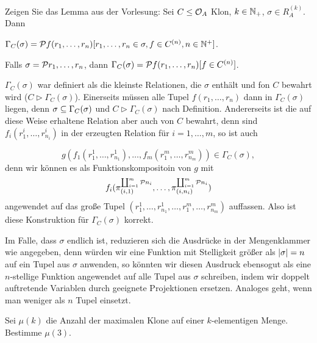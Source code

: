 \documentclass{book}
\begin{document}
\begin{exercise}
    Zeigen Sie das Lemma aus der Vorlesung:
    Sei $C\leq \mathcal{O}_A$ Klon, $k\in\mathbb{N}_+$, $\sigma\in R_A^{(k)}$. Dann
    \begin{statements}
            \item $\Gamma_C(\sigma)=\set{f(r_1,\ldots,r_n)}[r_1,\ldots,r_n\in\sigma,f\in C^{(n)},n\in\nats^+]$.
        \item Falls $\sigma=\set{r_1,\ldots,r_n}$, dann $\Gamma_C(\sigma)=\set{f(r_1,\ldots,r_n)}[f\in C^{(n)}]$.
    \end{statements}
\end{exercise}

\begin{solution}
    \begin{tasks}
        \item $\Gamma_C(\sigma)$ war definiert als die kleinste Relationen, die $\sigma$ enthält und fon $C$ bewahrt wird ($C\rhd \Gamma_C(\sigma)$). Einerseits müssen alle Tupel $f(r_1,\ldots,r_n)$ dann in $\Gamma_C(\sigma)$ liegen, denn $\sigma\subseteq\Gamma_C(\sigma)$ und $C\rhd \Gamma_C(\sigma)$ nach Definition.
    Andererseits ist die auf diese Weise erhaltene Relation aber auch von $C$ bewahrt, denn sind $f_i(r^i_1,\ldots,r^i_{n_i})$ in der erzeugten Relation für $i=1,\ldots,m$, so ist auch

    $$
    g(f_1(r^1_1,\ldots,r^1_{n_1}),\ldots,f_m(r^m_1,\ldots,r^m_{n_m}))\in\Gamma_C(\sigma),
    $$
    denn wir können es als Funktionskompositoin von $g$ mit
    $$f_i(\pi^{\coprod_{i=1}^m\set{n_i}}_{(i,1)},\ldots,\pi^{\coprod_{i=1}^m\set{n_i}}_{(i,n_i)})$$
    angewendet auf das große Tupel $(r^1_1,\ldots,r^1_{n_1},\ldots,r^m_1,\ldots,r^m_{n_m})$ auffassen. Also ist diese Konstruktion für $\Gamma_C(\sigma)$ korrekt.
        \item Im Falle, dass $\sigma$ endlich ist, reduzieren sich die Ausdrücke in der Mengenklammer wie angegeben, denn würden wir eine Funktion mit Stelligkeit größer als $\left|\sigma\right|=n$ auf ein Tupel aus $\sigma$ anwenden, so könnten wir diesen Ausdruck ebensogut als eine $n$-stellige Funktion angewendet auf alle Tupel aus $\sigma$ schreiben, indem wir doppelt auftretende Variablen durch geeignete Projektionen ersetzen.
    Analoges geht, wenn man weniger als $n$ Tupel einsetzt.
    \end{tasks}
\end{solution}

\begin{exercise}
    Sei $\mu(k)$ die Anzahl der maximalen Klone auf einer $k$-elementigen Menge. Bestimme $\mu(3)$.
\end{exercise}
\end{document}
